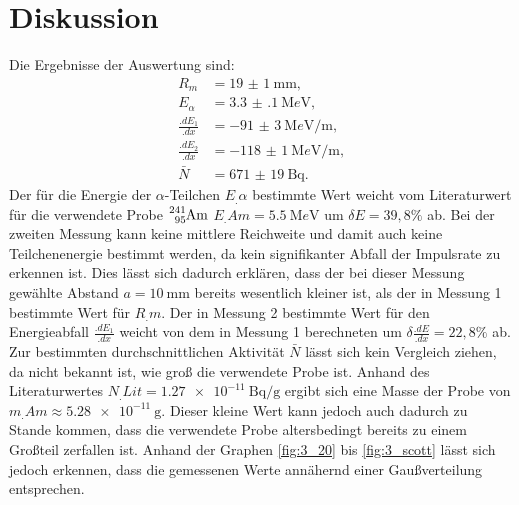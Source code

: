 
\section{Diskussion}
\label{sec:Diskussion}

Die Ergebnisse der Auswertung sind:
\begin{align*}
R_m			&= \SI{19(1)}{\milli\metre}\text{,}\\
E_\alpha 	&= \SI{3.3(1)}{\mega e\volt}\text{,}\\
\frac{.dE_1}{.dx}	&= \SI{-91(3)}{\mega e\volt\per\metre}\text{,}\\
\frac{.dE_2}{.dx}	&= \SI{-118(1)}{\mega e\volt\per\metre}\text{,}\\
\bar{N}		&= \SI{671(19)}{\becquerel} \text{.}
\end{align*}
Der für die Energie der $\alpha$-Teilchen $E_.{\alpha}$ bestimmte Wert weicht vom Literaturwert für die verwendete Probe $\ce{^{241}_{95}Am}$
$E_.{Am} = \SI{5,5}{\mega e\volt}$\cite{Americium-241} um $\delta E = 39,8\%$ ab.
Bei der zweiten Messung kann keine mittlere Reichweite und damit auch keine Teilchenenergie bestimmt werden, da kein signifikanter Abfall der Impulsrate zu erkennen ist. Dies lässt sich dadurch erklären, dass der bei dieser Messung gewählte Abstand $a=\SI{10}{\milli\metre}$ bereits wesentlich kleiner ist, als der in Messung 1 bestimmte Wert für $R_.m$.
Der in Messung 2 bestimmte Wert für den Energieabfall $\frac{.dE_1}{.dx}$ weicht von dem in Messung 1 berechneten um $\delta \frac{.dE}{.dx}= 22,8\%$ ab.
Zur bestimmten durchschnittlichen Aktivität $\bar{N}$ lässt sich kein Vergleich ziehen, da nicht bekannt ist, wie groß die verwendete Probe ist.
Anhand des Literaturwertes $N_.{Lit}=\SI{1,27e-11}{\becquerel\per\gram}$\cite{Americium-241} ergibt sich eine Masse der Probe von $m_.{Am}\approx \SI{5,28e-11}{\gram}$. Dieser kleine Wert kann jedoch auch dadurch zu Stande kommen, dass die verwendete Probe altersbedingt bereits zu einem Großteil zerfallen ist.
Anhand der Graphen \ref{fig:3_20} bis \ref{fig:3_scott} lässt sich jedoch erkennen, dass die gemessenen Werte annähernd einer Gaußverteilung entsprechen.